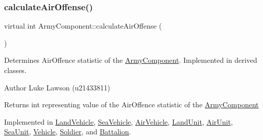 \mbox{\label{class_army_component_aeea4bed9a4850e9b74f9306a8443085c}} 
\subsubsection{\texorpdfstring{calculateAirOffense()}{calculateAirOffense()}}
{\footnotesize\ttfamily virtual int Army\+Component\+::calculate\+Air\+Offense (\begin{DoxyParamCaption}{ }\end{DoxyParamCaption})\hspace{0.3cm}{\ttfamily [pure virtual]}}



Determines Air\+Offence statistic of the \mbox{\hyperlink{class_army_component}{Army\+Component}}. Implemented in derived classes. 

\begin{DoxyAuthor}{Author}
Luke Lawson (u21433811) 
\end{DoxyAuthor}
\begin{DoxyReturn}{Returns}
int representing value of the Air\+Offence statistic of the \mbox{\hyperlink{class_army_component}{Army\+Component}} 
\end{DoxyReturn}


Implemented in \mbox{\hyperlink{class_land_vehicle_a2453f77778b1c36b2b2fbeb19d06776e}{Land\+Vehicle}}, \mbox{\hyperlink{class_sea_vehicle_a24b41898db73af6d04ae91ddcf97f4a4}{Sea\+Vehicle}}, \mbox{\hyperlink{class_air_vehicle_a1365cb66c2a8755e689f938c734df6c0}{Air\+Vehicle}}, \mbox{\hyperlink{class_land_unit_af6b72446b89f0cceda3e71f0ccefd41e}{Land\+Unit}}, \mbox{\hyperlink{class_air_unit_a522f54b197f6b2daf784f4a9eacb9edc}{Air\+Unit}}, \mbox{\hyperlink{class_sea_unit_aa2d92acd5e3798fdddfa860d5a9d346b}{Sea\+Unit}}, \mbox{\hyperlink{class_vehicle_a0a6c6ed9d25c66415f83191894b11499}{Vehicle}}, \mbox{\hyperlink{class_soldier_ad5290f69e84772e9a3bfc060b5d348a0}{Soldier}}, and \mbox{\hyperlink{class_battalion_ae3489e11413500aa1c1878f0651bebdc}{Battalion}}.

\mbox{\label{class_army_component_a88558b28106a5d461fcc9ca2eb8e7a40}} 
